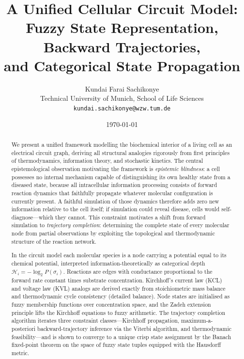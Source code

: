 \documentclass[twocolumn,10pt,a4paper]{article}
\title{\textbf{A Unified Cellular Circuit Model:\\[4pt]
Fuzzy State Representation, Backward Trajectories,\\
and Categorical State Propagation}}
\author{Kundai Farai Sachikonye\\[4pt]
\small Technical University of Munich, School of Life Sciences\\
\small \texttt{kundai.sachikonye@wzw.tum.de}}
\date{\today}
\newcommand{\Hcat}{\mathcal{H}}
\begin{document}
\maketitle

\begin{abstract}
We present a unified framework modelling the biochemical interior of a living
cell as an electrical circuit graph, deriving all structural analogies
rigorously from first principles of thermodynamics, information theory, and
stochastic kinetics.  The central epistemological observation motivating the
framework is \emph{epistemic blindness}: a cell possesses no internal mechanism
capable of distinguishing its own healthy state from a diseased state, because
all intracellular information processing consists of forward reaction dynamics
that faithfully propagate whatever molecular configuration is currently present.
A faithful simulation of those dynamics therefore adds zero new information
relative to the cell itself; if simulation could reveal disease, cells would
self-diagnose---which they cannot.  This constraint motivates a shift from
forward simulation to \emph{trajectory completion}: determining the complete
state of every molecular node from partial observations by exploiting the
topological and thermodynamic structure of the reaction network.

In the circuit model each molecular species is a node carrying a potential
equal to its chemical potential, interpreted information-theoretically as
categorical depth $\Hcat_i = -\log_2 P(\sigma_i)$.  Reactions are edges with
conductance proportional to the forward rate constant times substrate
concentration.  Kirchhoff's current law (KCL) and voltage law (KVL) analogs
are derived exactly from stoichiometric mass balance and thermodynamic cycle
consistency (detailed balance).  Node states are initialised as fuzzy
membership functions over concentration space, and the Zadeh extension
principle lifts the Kirchhoff equations to fuzzy arithmetic.  The trajectory
completion algorithm iterates three constraint classes---Kirchhoff propagation,
maximum-a-posteriori backward-trajectory inference via the Viterbi algorithm,
and thermodynamic feasibility---and is shown to converge to a unique crisp
state assignment by the Banach fixed-point theorem on the space of fuzzy state
tuples equipped with the Hausdorff metric.


\end{abstract}
\end{document}
